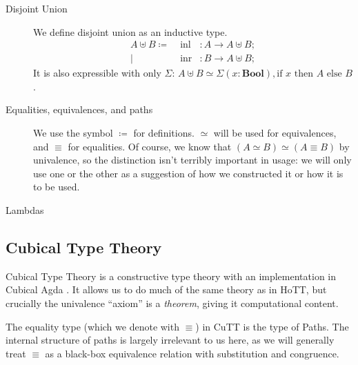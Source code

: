 \begin{description}
  \item[Disjoint Union] We define disjoint union as an inductive type.
    \begin{equation}
      \begin{alignedat}{3}
        A \uplus B \coloneqq & \;
        \text{inl} &: A \rightarrow A \uplus B ; \\
        | & \;  \text{inr} &: B \rightarrow A \uplus B ;
      \end{alignedat}
    \end{equation}
    It is also expressible with only \(\Sigma\):
    \(A \uplus B \simeq \Sigma(x : \mathbf{Bool}) , \text{if } x \text{ then
    } A \text{ else } B \).
  \item[Equalities, equivalences, and paths] We use the symbol \(\coloneqq\)
    for definitions.
    \(\simeq\) will be used for equivalences, and \(\equiv\) for equalities.
    Of course, we know that \((A \simeq B) \simeq (A \equiv B)\) by univalence,
    so the distinction isn't terribly important in usage: we will only use one
    or the other as a suggestion of how we constructed it or how it is to be
    used.
  \item[Lambdas] 
\end{description}
\subsection{Cubical Type Theory}
Cubical Type Theory \cite{cohenCubicalTypeTheory2016} is a constructive type
theory with an implementation in Cubical Agda
\cite{vezzosiCubicalAgdaDependently2019}.
It allows us to do much of the same theory as in HoTT, but crucially the
univalence ``axiom'' is a \emph{theorem}, giving it computational content.
\begin{definition} \label{path-types}
  The equality type (which we denote with \(\equiv\)) in CuTT is the type of
  Paths\footnotemark.
  The internal structure of paths is largely irrelevant to us here, as we will
  generally treat \(\equiv\) as a black-box equivalence relation with
  substitution and congruence.
\end{definition}

